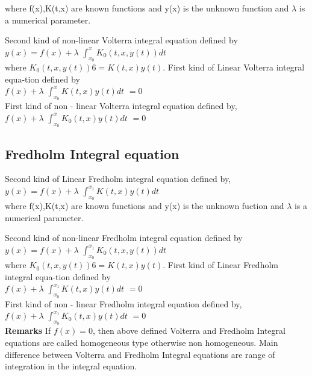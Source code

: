 \documentclass[12pt]{article}
\begin{document}
where f(x),K(t,x) are known functions and y(x) is the unknown function and $\lambda$ is a numerical parameter.

Second kind of non-linear Volterra integral equation defined by 
\\

$y(x) = f(x) + \lambda$ \(\int_{x_0}^{x}K_0(t,x,y(t))dt\)\\

where $K_0(t, x, y(t)) 6 =K(t, x)y(t)$. First kind of Linear Volterra integral equa-tion defined by
\\

$f(x) + \lambda$ \(\int_{x_0}^{x}K(t,x)y(t)dt\) $= 0$\\

First kind of non - linear Volterra integral equation defined by,
\\

$f(x) + \lambda$ \(\int_{x_0}^{x}K_0(t,x)y(t)dt\) $= 0$\\

\subsection{Fredholm Integral equation}
Second kind of Linear Fredholm integral equation defined by,
\\

$y(x) = f(x) + \lambda$ \(\int_{x_0}^{x_1} K(t,x)y(t)dt\)\\

where f(x),K(t,x) are known functions and y(x) is the unknown fuction and $\lambda$ is a numerical parameter.

Second kind of non-linear Fredholm integral equation defined by 
\\

$y(x) = f(x) + \lambda$ \(\int_{x_0}^{x_1}K_0(t,x,y(t))dt\)\\

where $K_0(t, x, y(t)) 6 =K(t, x)y(t)$. First kind of Linear Fredholm integral equa-tion defined by
\\

$f(x) + \lambda$ \(\int_{x_0}^{x_1}K(t,x)y(t)dt\) $= 0$\\

First kind of non - linear Fredholm integral equation defined by,
\\

$f(x) + \lambda$ \(\int_{x_0}^{x_1}K_0(t,x)y(t)dt\) $= 0$\\

\textbf{Remarks} If $f(x) = 0$, then above defined Volterra and Fredholm Integral equations are called homogeneous type otherwise non homogeneous. Main difference between Volterra and Fredholm Integral equations are range of integration in the integral equation.
\end{document}
